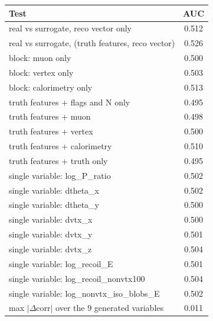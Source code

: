 \begin{tabular}{lc}
\toprule
Test & AUC \\
\midrule
real vs surrogate, reco vector only & 0.512 \\
real vs surrogate, (truth features, reco vector) & 0.526 \\
\midrule
block: muon only & 0.500 \\
block: vertex only & 0.503 \\
block: calorimetry only & 0.513 \\
truth features + flags and N only & 0.495 \\
truth features + muon & 0.498 \\
truth features + vertex & 0.500 \\
truth features + calorimetry & 0.510 \\
truth features + truth only & 0.495 \\
single variable: log\_P\_ratio & 0.502 \\
single variable: dtheta\_x & 0.502 \\
single variable: dtheta\_y & 0.500 \\
single variable: dvtx\_x & 0.500 \\
single variable: dvtx\_y & 0.501 \\
single variable: dvtx\_z & 0.504 \\
single variable: log\_recoil\_E & 0.501 \\
single variable: log\_recoil\_nonvtx100 & 0.504 \\
single variable: log\_nonvtx\_iso\_blobs\_E & 0.502 \\
\midrule
max $|\Delta$corr$|$ over the 9 generated variables & 0.011 \\
\bottomrule
\end{tabular}
